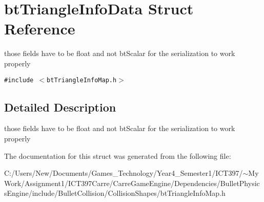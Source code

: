 \hypertarget{structbt_triangle_info_data}{
\section{btTriangleInfoData Struct Reference}
\label{structbt_triangle_info_data}
}
those fields have to be float and not btScalar for the serialization to work properly  


{\tt \#include $<$btTriangleInfoMap.h$>$}



\subsection{Detailed Description}
those fields have to be float and not btScalar for the serialization to work properly 

The documentation for this struct was generated from the following file:\begin{CompactItemize}
\item 
C:/Users/New/Documents/Games\_\-Technology/Year4\_\-Semester1/ICT397/$\sim$My Work/Assignment1/ICT397Carre/CarreGameEngine/Dependencies/BulletPhysicsEngine/include/BulletCollision/CollisionShapes/btTriangleInfoMap.h\end{CompactItemize}
